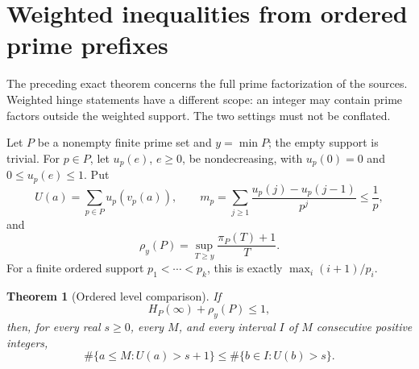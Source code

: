\documentclass[11pt,a4paper]{article}
\newtheorem{theorem}{Theorem}[section]
\theoremstyle{remark}
\begin{document}
\section{Weighted inequalities from ordered prime prefixes}
\label{sec:hinge}

The preceding exact theorem concerns the full prime factorization of
the sources. Weighted hinge statements have a different scope: an
integer may contain prime factors outside the weighted support.
The two settings must not be conflated.

Let \(P\) be a nonempty finite prime set and \(y=\min P\); the empty
support is trivial. For \(p\in P\), let
\(u_p(e)\), \(e\ge0\), be nondecreasing, with \(u_p(0)=0\) and
\(0\le u_p(e)\le1\). Put
\[
 U(a)=\sum_{p\in P}u_p(v_p(a)),\qquad
 m_p=\sum_{j\ge1}\frac{u_p(j)-u_p(j-1)}{p^j}\le\frac1p,
 \tag{5.1}
\]
and
\[
 \rho_y(P)=\sup_{T\ge y}\frac{\pi_P(T)+1}{T}.
 \tag{5.2}
\]
For a finite ordered support \(p_1<\cdots<p_k\), this is exactly
\(\max_i(i+1)/p_i\).

\begin{theorem}[Ordered level comparison]
\label{thm:levels}
If
\[
 H_P(\infty)+\rho_y(P)\le1,
 \tag{5.3}
\]
then, for every real \(s\ge0\), every \(M\), and every interval \(I\)
of \(M\) consecutive positive integers,
\[
 \#\{a\le M:U(a)>s+1\}
 \le
 \#\{b\in I:U(b)>s\}.
 \tag{5.4}
\]
\end{theorem}
\end{document}
